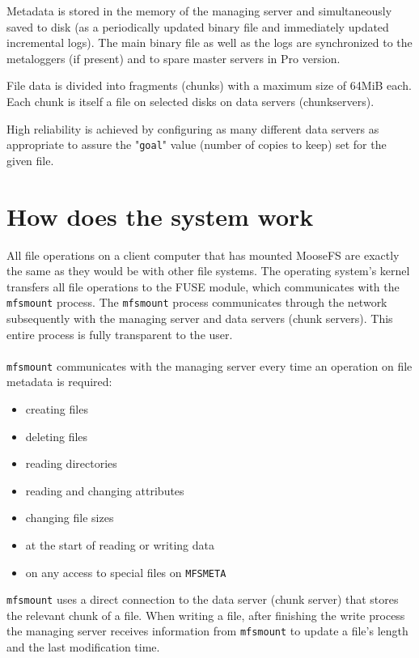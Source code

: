 \documentclass[a4paper,11pt,english]{report}
\def\code#1{\texttt{#1}}
\begin{document}
		Metadata is stored in the memory of the managing server and simultaneously saved to disk (as a periodically updated binary file and immediately updated incremental logs). The main binary file as well as the logs are synchronized to the metaloggers (if present) and to spare master servers in Pro version.
		
		File data is divided into fragments (chunks) with a maximum size of 64MiB each. Each chunk is itself a file on selected disks on data servers (chunkservers).
		
High reliability is achieved by configuring as many different data servers as appropriate to assure the "\code{goal}" value (number of copies to keep) set for the given file.
		
		
		\section{How does the system work}
		All file operations on a client computer that has mounted MooseFS are exactly the same as they would be with other file systems. The operating system's kernel transfers all file operations to the FUSE module, which communicates with the \code{mfsmount} process. The \code{mfsmount} process communicates through the network subsequently with the managing server and data servers (chunk servers). This entire process is fully transparent to the user.\\\\
		
		\code{mfsmount} communicates with the managing server every time an operation on file metadata is required:
		\begin{itemize}
			\item creating files
			\item deleting files
			\item reading directories
			\item reading and changing attributes
			\item changing file sizes
			\item at the start of reading or writing data
			\item on any access to special files on \code{MFSMETA}
		\end{itemize}		

		\bigskip
		\code{mfsmount} uses a direct connection to the data server (chunk server) that stores the relevant chunk of a file. When writing a file, after finishing the write process the managing server receives information from \code{mfsmount} to update a file's length and the last modification time.
		
\end{document}
